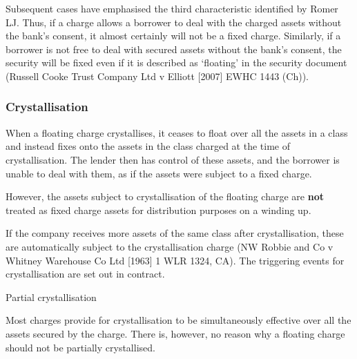 \documentclass[
]{article}
\newenvironment{env-486fc4cd-eb32-4215-aaa2-fc77a67eebc5}
{
    \savenotes\tcolorbox[blanker,breakable,left=5pt,borderline west={2pt}{-4pt}{blue}]
}
{
    \endtcolorbox\spewnotes
}
\begin{document}
Subsequent cases have emphasised the third characteristic identified by
Romer LJ. Thus, if a charge allows a borrower to deal with the charged
assets without the bank's consent, it almost certainly will not be a
fixed charge. Similarly, if a borrower is not free to deal with secured
assets without the bank's consent, the security will be fixed even if it
is described as `floating' in the security document (Russell Cooke Trust
Company Ltd v Elliott {[}2007{]} EWHC 1443 (Ch)).

\hypertarget{crystallisation}{%
\subsubsection{Crystallisation}\label{crystallisation}}

When a floating charge crystallises, it ceases to float over all the
assets in a class and instead fixes onto the assets in the class charged
at the time of crystallisation. The lender then has control of these
assets, and the borrower is unable to deal with them, as if the assets
were subject to a fixed charge.

However, the assets subject to crystallisation of the floating charge
are \textbf{not} treated as fixed charge assets for distribution
purposes on a winding up.

If the company receives more assets of the same class after
crystallisation, these are automatically subject to the crystallisation
charge (NW Robbie and Co v Whitney Warehouse Co Ltd {[}1963{]} 1 WLR
1324, CA). The triggering events for crystallisation are set out in
contract.

\begin{env-486fc4cd-eb32-4215-aaa2-fc77a67eebc5}

Partial crystallisation

Most charges provide for crystallisation to be simultaneously effective
over all the assets secured by the charge. There is, however, no reason
why a floating charge should not be partially crystallised.

\end{env-486fc4cd-eb32-4215-aaa2-fc77a67eebc5}
\end{document}
